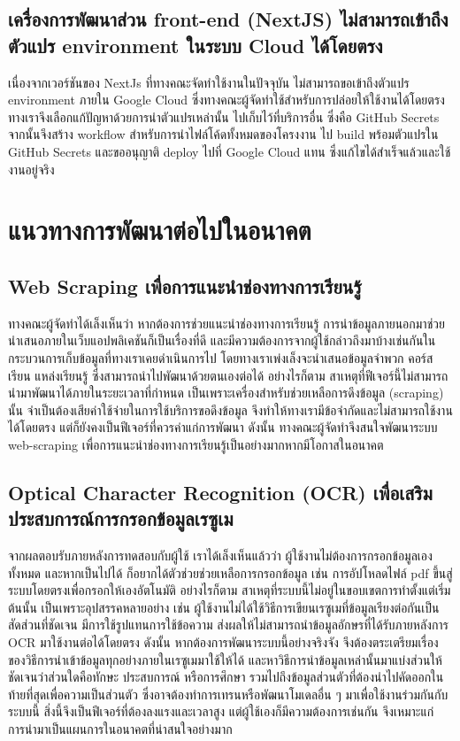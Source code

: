 \subsection{เครื่องการพัฒนาส่วน front-end (NextJS) ไม่สามารถเข้าถึงตัวแปร environment ในระบบ Cloud ได้โดยตรง}
\par{
    เนื่องจากเวอร์ชันของ NextJs ที่ทางคณะจัดทำใช้งานในปัจจุบัน ไม่สามารถขอเข้าถึงตัวแปร environment ภายใน Google Cloud ซึ่งทางคณะผู้จัดทำใช้สำหรับการปล่อยให้ใช้งานได้โดยตรง
    ทางเราจึงเลือกแก้ปัญหาด้วยการนำตัวแปรเหล่านั้น ไปเก็บไว้ที่บริการอื่น ซึ่งคือ GitHub Secrets จากนั้นจึงสร้าง workflow สำหรับการนำไฟล์โค้ดทั้งหมดของโครงงาน
    ไป build พร้อมตัวแปรใน GitHub Secrets และขออนุญาติ deploy ไปที่ Google Cloud แทน ซึ่งแก้ไขได้สำเร็จแล้วและใช้งานอยู่จริง
}

\section{แนวทางการพัฒนาต่อไปในอนาคต}
\subsection{Web Scraping เพื่อการแนะนำช่องทางการเรียนรู้}
\par{
    ทางคณะผู้จัดทำได้เล็งเห็นว่า หากต้องการช่วยแนะนำช่องทางการเรียนรู้ การนำข้อมูลภายนอกมาช่วยนำเสนอภายในเว็บแอปพลิเคชันก็เป็นเรื่องที่ดี และมีความต้องการจากผู้ใช้กล่าวถึงมาบ้างเช่นกันในกระบวนการเก็บข้อมูลที่ทางเราเคยดำเนินการไป
    โดยทางเราเพ่งเล็งจะนำเสนอข้อมูลจำพวก คอร์สเรียน แหล่งเรียนรู้ ซึ่งสามารถนำไปพัฒนาด้วยตนเองต่อได้ อย่างไรก็ตาม สาเหตุที่ฟีเจอร์นี้ไม่สามารถนำมาพัฒนาได้ภายในระยะเวลาที่กำหนด
    เป็นเพราะเครื่องสำหรับช่วยเหลือการดึงข้อมูล (scraping) นั้น จำเป็นต้องเสียค่าใช้จ่ายในการใช้บริการขอดึงข้อมูล จึงทำให้ทางเรามีข้อจำกัดและไม่สามารถใช้งานได้โดยตรง แต่ก็ยังคงเป็นฟีเจอร์ที่ควรค่าแก่การพัฒนา ดังนั้น
    ทางคณะผู้จัดทำจึงสนใจพัฒนาระบบ web-scraping เพื่อการแนะนำช่องทางการเรียนรู้เป็นอย่างมากหากมีโอกาสในอนาคต
}
\subsection{Optical Character Recognition (OCR) เพื่อเสริมประสบการณ์การกรอกข้อมูลเรซูเม}
\label{subsec:Future Plan OCR}
\par{
    จากผลตอบรับภายหลังการทดสอบกับผู้ใช้ เราได้เล็งเห็นแล้วว่า ผู้ใช้งานไม่ต้องการกรอกข้อมูลเองทั้งหมด และหากเป็นไปได้ ก็อยากได้ตัวช่วยช่วยเหลือการกรอกข้อมูล
    เช่น การอัปโหลดไฟล์ pdf ขึ้นสู่ระบบโดยตรงเพื่อกรอกให้เองอัตโนมัติ อย่างไรก็ตาม สาเหตุที่ระบบนี้ไม่อยู่ในขอบเขตการทำตั้งแต่เริ่มต้นนั้น เป็นเพราะอุปสรรคหลายอย่าง
    เช่น ผู้ใช้งานไม่ได้ใช้วิธีการเขียนเรซูเมที่ข้อมูลเรียงต่อกันเป็นสัดส่วนที่ชัดเจน มีการใช้รูปแทนการใช้ข้อความ ส่งผลให้ไม่สามารถนำข้อมูลอักษรที่ได้รับภายหลังการ OCR มาใช้งานต่อได้โดยตรง
    ดังนั้น หากต้องการพัฒนาระบบนี้อย่างจริงจัง จึงต้องตระเตรียมเรื่องของวิธีการนำเข้าข้อมูลทุกอย่างภายในเรซูเมมาใช้ให้ได้ และหาวิธีการนำข้อมูลเหล่านั้นมาแบ่งส่วนให้ชัดเจนว่าส่วนใดคือทักษะ ประสบการณ์ หรือการศึกษา รวมไปถึงข้อมูลส่วนตัวที่ต้องนำไปคัดออกในท้ายที่สุดเพื่อความเป็นส่วนตัว
    ซึ่งอาจต้องทำการเทรนหรือพัฒนาโมเดลอื่น ๆ มาเพื่อใช้งานร่วมกันกับระบบนี้ สิ่งนี้จึงเป็นฟีเจอร์ที่ต้องลงแรงและเวลาสูง แต่ผู้ใช้เองก็มีความต้องการเช่นกัน จึงเหมาะแก่การนำมาเป็นแผนการในอนาคตที่น่าสนใจอย่างมาก
}

